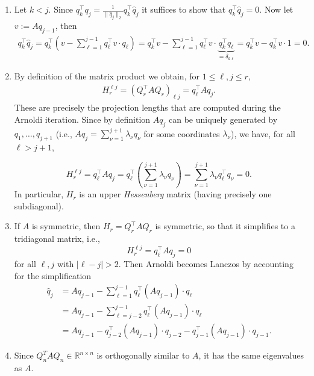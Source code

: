 {\color{solution}
\begin{enumerate}
	\item Let $k < j$. Since $q_k^\top q_j = \frac{1}{ \|\widehat{q}_j\|_2} q_k^\top \widehat{q}_j$ it suffices to show that $q_k^\top \widehat{q}_j=0$. Now let $v:=Aq_{j-1}$, then
	\begin{align*}
q_k^\top 	\widehat{q}_j  = q_k^\top \left(v - \sum_{\ell = 1}^{j-1} q_\ell^\top v  \cdot q_\ell\right)  
	= q_k^\top v - \sum_{\ell = 1}^{j-1} q_\ell^\top v   \cdot \underbrace{q_k^\top q_\ell}_{= \delta_{k\ell}} 
	=q_k^\top v -  q_k^\top v\cdot 1
	=0.  
	\end{align*}
	\item By definition of the matrix product we obtain, for $1\leq \ell,j \leq r$,
	\begin{align*}
	  H_r^{\ell j} = (Q_r^\top AQ_r)_{\ell j} = q_\ell ^\top Aq_j  .
	\end{align*}
	These are precisely the projection lengths that are computed during the Arnoldi iteration. Since by definition $Aq_j$ can be uniquely generated by $q_1,\ldots, q_{j+1}$ (i.e., $Aq_j=\sum_{\nu = 1}^{j+1}\lambda_\nu q_\nu$ for some coordinates $\lambda_\nu$), we have, for all $\ell> j+1$,
	
	$$H_r^{\ell j} = q_\ell ^\top Aq_j = q_\ell^\top \left(\sum_{\nu = 1}^{j+1}\lambda_\nu q_\nu\right) =\sum_{\nu = 1}^{j+1}\lambda_\nu q_\ell^\top q_\nu = 0 .$$ 
	In particular, $H_r$ is an upper \textit{Hessenberg} matrix (having precisely one subdiagonal).
	\item If $A$ is symmetric, then $H_r = Q_r^\top A Q_r$ is symmetric, so that it simplifies to a tridiagonal matrix, i.e., $$H_r^{\ell j} =q_\ell ^\top Aq_j = 0$$ for all $\ell,j$ with $|\ell-j|> 2$. Then Arnoldi becomes Lanczos by accounting for the simplification
	\begin{align*}
	 \widehat{q}_j 
	 &= Aq_{j-1} - \sum_{\ell = 1}^{j-1} q_\ell^\top(Aq_{j-1})  \cdot q_\ell\\
	 &= Aq_{j-1} - \sum_{\ell = j-2}^{j-1} q_\ell^\top(Aq_{j-1})  \cdot q_\ell\\
	 &= Aq_{j-1} - q_{j-2}^\top(Aq_{j-1})  \cdot q_{j-2} - q_{j-1}^\top(Aq_{j-1})\cdot q_{j-1}.
	\end{align*}
  \item Since $Q_n^TAQ_n \in \mathbb{R}^{n \times n}$ is orthogonally similar to $A$, it has the same eigenvalues as $A$. 
\end{enumerate}



}